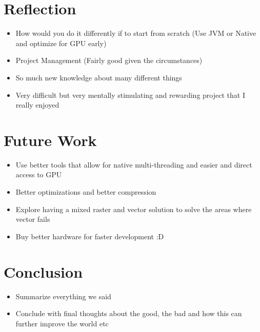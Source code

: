 \documentclass[14pt]{article}
\begin{document}
    \section{Reflection}

    \begin{itemize}
        \item How would you do it differently if to start from scratch (Use JVM or Native and optimize for GPU early)
        \item Project Management (Fairly good given the circumstances)
        \item So much new knowledge about many different things
        \item Very difficult but very mentally stimulating and rewarding project that I really enjoyed
    \end{itemize}


    \section{Future Work}

    \begin{itemize}
        \item Use better tools that allow for native multi-threading and easier and direct access to GPU
        \item Better optimizations and better compression
        \item Explore having a mixed raster and vector solution to solve the areas where vector fails
        \item Buy better hardware for faster development :D
    \end{itemize}


    \section{Conclusion}

    \begin{itemize}
        \item Summarize everything we said
        \item Conclude with final thoughts about the good, the bad and how this can further improve the world etc
    \end{itemize}
\end{document}
